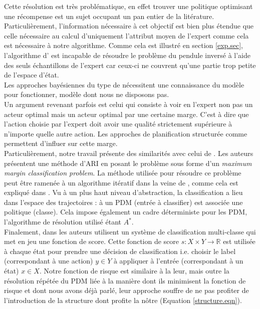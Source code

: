 \documentclass[publibook-draft]{CAp2012}
\begin{document}
Cette résolution est très problématique, en effet trouver une politique optimisant une récompense est un sujet occupant un pan entier de la litérature. Particulièrement, l'information nécessaire à cet objectif est bien plus étendue que celle nécessaire au calcul d'uniquement l'attribut moyen de l'expert comme cela est nécessaire à notre algorithme. Comme cela est illustré en section \ref{exp.sec}, l'algorithme d'\citet{abbeel2004apprenticeship} est incapable de résoudre le problème du pendule inversé à l'aide des seuls échantillons de l'expert car ceux-ci ne couvrent qu'une partie trop petite de l'espace d'état.\\

Les approches bayésiennes du type de \cite{ramachandran2007bayesian} nécessitent une connaissance du modèle pour fonctionner, modèle dont nous ne disposons pas.\\

Un argument revenant parfois est celui qui consiste à voir en l'expert non pas un acteur optimal mais un acteur optimal par une certaine marge. C'est à dire que l'action choisie par l'expert doit avoir une qualité strictement supérieure à n'importe quelle autre action. Les approches de planification structurée comme \citet{ratliff2006maximum,ratliff2007imitation, ratliff2007boosting, kolter2008hierarchical} permettent d'influer sur cette marge.\\

Particulièrement, notre travail présente des similarités avec celui de \citet{ratliff2006maximum}. Les auteurs présentent une méthode d'ARI en posant le problème sous forme d'un \emph{maximum margin classification problem}. La méthode utilisée pour résoudre ce problème peut être ramenée à un algorithme itératif dans la veine de \cite{abbeel2004apprenticeship}, comme cela est expliqué dans \cite{neu2009training}. Vu à un plus haut niveau d'abstraction, la classification a lieu dans l'espace des trajectoires : à un PDM (entrée à classifier) est associée une politique (classe). Cela impose également un cadre déterministe pour les PDM, l'algorithme de résolution utilisé étant $A^*$.\\

Finalement, dans \citep{ratliff2007imitation} les auteurs utilisent un système de classification multi-classe qui met en jeu une fonction de score. Cette fonction de score $s : X\times Y \rightarrow \mathbb{R}$ est utilisée à chaque état pour prendre une décision de classification i.e. choisir le label (correspondant à une action) $y\in Y$ à appliquer à l'entrée (correspondant à un état) $x\in X$. Notre fonction de risque est similaire à la leur, mais outre la résolution répétée du PDM liée à la manière dont ils minimisent la fonction de risque et dont nous avons déjà parlé, leur approche souffre de ne pas profiter de l'introduction de la structure dont profite la nôtre (Equation \eqref{structure.eqn}).
\end{document}
